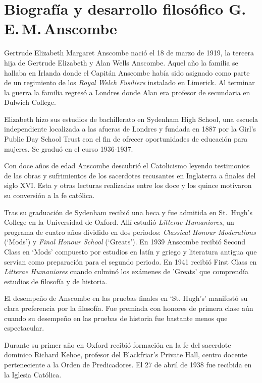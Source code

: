 \section{Biografía y desarrollo filosófico G.\,E.\,M.\,Anscombe}

Gertrude Elizabeth Margaret Anscombe nació el 18 de marzo de 1919, la tercera hija de Gertrude Elizabeth y Alan Wells Anscombe. Aquel año la familia se hallaba en Irlanda donde el Capitán Anscombe había sido asignado como parte de un regimiento de los \emph{Royal Welch Fusiliers} instalado en Limerick. Al terminar la guerra la familia regresó a Londres donde Alan era profesor de secundaria en Dulwich College.\autocite[Cf.~][31]{teichman2002fellows}

Elizabeth hizo sus estudios de bachillerato en Sydenham High School, una escuela independiente localizada a las afueras de Londres y fundada en 1887 por la Girl's Public Day School Trust con el fin de ofrecer oportunidades de educación para mujeres. Se graduó en el curso 1936-1937.

Con doce años de edad Anscombe descubrió el Catolicismo leyendo testimonios de las obras y sufrimientos de los sacerdotes recusantes en Inglaterra a finales del siglo XVI. Esta y otras lecturas realizadas entre los doce y los quince motivaron su conversión a la fe católica.\autocite[Cf.~][33]{teichman2002fellows}

Tras su graduación de Sydenham recibió una beca y fue admitida en St.~Hugh's College en la Universidad de Oxford. Allí estudió \emph{Litterae Humaniores}, un programa de cuatro años dividido en dos periodos: \emph{Classical Honour Moderations} (`Mods') y \emph{Final Honour School} (`Greats'). En 1939 Anscombe recibió Second Class en `Mods' compuesto por estudios en latín y griego y literatura antigua que servían como preparación para el segundo periodo. En 1941 recibió First Class en \emph{Litterae Humaniores} cuando culminó los exámenes de 'Greats' que comprendía estudios de filosofía y de historia.

El desempeño de Anscombe en las pruebas finales en `St. Hugh's' manifestó su clara preferencia por la filosofía. Fue premiada con honores de primera clase aún cuando su desempeño en las pruebas de historia fue bastante menos que espectacular.\autocite[Cf.~][3]{teichmann2008ans}

Durante su primer año en Oxford recibió formación en la fe del sacerdote dominico Richard Kehoe, profesor del Blackfriar's Private Hall, centro docente perteneciente a la Orden de Predicadores. El 27 de abril de 1938 fue recibida en la Iglesia Católica.

